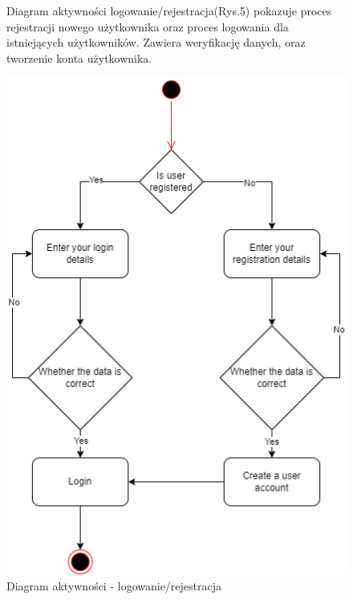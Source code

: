 \documentclass[]{article}
\begin{document}
\begin{figure}[ht]
	\begin{minipage}{\textwidth}
		Diagram aktywności logowanie/rejestracja(Rys.5) pokazuje proces rejestracji nowego użytkownika oraz proces logowania dla istniejących użytkowników. Zawiera weryfikację danych, oraz tworzenie konta użytkownika.
	\end{minipage}
	\vspace{15pt}
	
	\centering
	\includegraphics[scale=0.50]{log_rej.png}
	\caption{Diagram aktywności - logowanie/rejestracja}
\end{figure}
\end{document}
